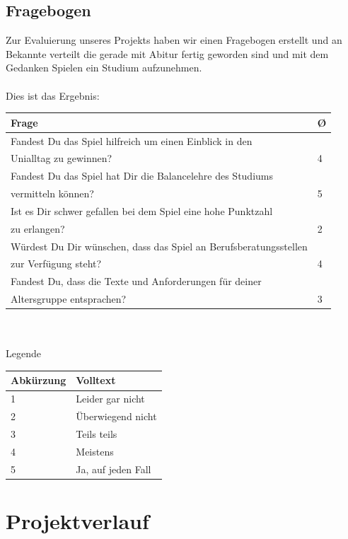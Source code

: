 \documentclass[a4paper, 11pt]{article} %
\begin{document}
\subsection{Fragebogen}
Zur Evaluierung unseres Projekts haben wir einen Fragebogen erstellt und an Bekannte verteilt die gerade mit Abitur fertig geworden sind und mit dem Gedanken Spielen ein Studium aufzunehmen. \\\\
Dies ist das Ergebnis: \\
\begin{tabular}{|lp{0.19cm}|}
\hline 
\textbf{Frage} & \textbf{\O} \\
\hline 
Fandest Du das Spiel hilfreich um einen Einblick in den & \\
Unialltag zu gewinnen? & 4 \\
Fandest Du das Spiel hat Dir die Balancelehre des Studiums & \\
vermitteln können? & 5 \\
Ist es Dir schwer gefallen bei dem Spiel eine hohe Punktzahl & \\
zu erlangen? & 2 \\
Würdest Du Dir wünschen, dass das Spiel an Berufsberatungsstellen & \\
zur Verfügung steht? & 4 \\
Fandest Du, dass die Texte und Anforderungen für deiner & \\
 Altersgruppe entsprachen? & 3 \\
\hline
\end{tabular} \\\\
Legende \\
\begin{tabular}{|lp{3cm}|}
\hline 
\textbf{Abkürzung} & \textbf{Volltext} \\
\hline 
1 & Leider gar nicht \\
2 & Überwiegend nicht \\
3 & Teils teils \\
4 & Meistens \\
5 & Ja, auf jeden Fall \\
\hline
\end{tabular}

\section{Projektverlauf}
\end{document}
